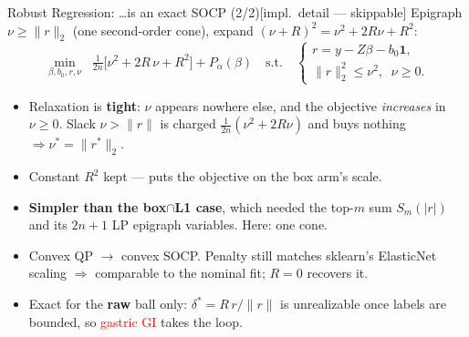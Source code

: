 \documentclass{beamer}
\newcommand{\implnote}{\hfill{\normalfont\scriptsize\color{gray}[impl.\ detail --- skippable]}}
\newcommand{\mc}[1]{\textcolor{red}{#1}}
\begin{document}
\begin{frame}{Robust Regression: \dots is an exact SOCP (2/2)\implnote}
  \small
  Epigraph $\nu \ge \lVert r\rVert_2$ (one second-order cone), expand
  $(\nu+R)^2=\nu^2+2R\nu+R^2$:
  \[
    \min_{\beta,b_0,r,\nu}\;\; \tfrac{1}{2n}\big[\nu^2 + 2R\,\nu + R^2\big] + P_\alpha(\beta)
    \quad\text{s.t.}\quad
    \begin{cases}
      r = y - Z\beta - b_0\mathbf 1,\\[0.2em]
      \lVert r\rVert_2^2 \le \nu^2,\;\; \nu\ge0 .
    \end{cases}
  \]
  \begin{itemize}
    \item Relaxation is \textbf{tight}: $\nu$ appears nowhere else, and the objective
      \emph{increases} in $\nu\ge0$. Slack $\nu>\lVert r\rVert$ is charged
      $\tfrac{1}{2n}(\nu^2+2R\nu)$ and buys nothing $\Rightarrow \nu^\ast=\lVert r^\ast\rVert_2$.
    \item Constant $R^2$ kept --- puts the objective on the box arm's scale.
    \item \textbf{Simpler than the box$\cap$L1 case}, which needed the top-$m$ sum
      $S_m(|r|)$ and its $2n{+}1$ LP epigraph variables. Here: one cone.
    \item Convex QP $\to$ convex SOCP. Penalty still matches sklearn's ElasticNet
      scaling $\Rightarrow$ comparable to the nominal fit; $R=0$ recovers it.
    \item Exact for the \textbf{raw} ball only: $\delta^\ast=R\,r/\lVert r\rVert$ is
      unrealizable once labels are bounded, so \mc{gastric GI} takes the loop.
  \end{itemize}
\end{frame}
\end{document}
